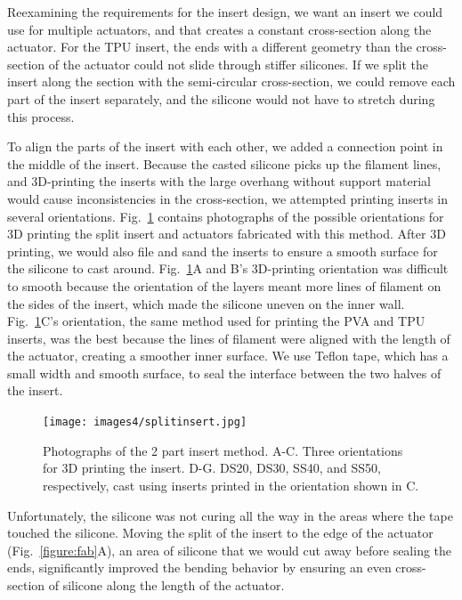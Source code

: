 Reexamining the requirements for the insert design, we want an insert we could use for multiple actuators, and that creates a constant cross-section along the actuator. For the TPU insert, the ends with a different geometry than the cross-section of the actuator could not slide through stiffer silicones. If we split the insert along the section with the semi-circular cross-section, we could remove each part of the insert separately, and the silicone would not have to stretch during this process. 

To align the parts of the insert with each other, we added a connection point in the middle of the insert. Because the casted silicone picks up the filament lines, and 3D-printing the inserts with the large overhang without support material would cause inconsistencies in the cross-section, we attempted printing inserts in several orientations. Fig.~\ref{fig:splitinsert} contains photographs of the possible orientations for 3D printing the split insert and actuators fabricated with this method. After 3D printing, we would also file and sand the inserts to ensure a smooth surface for the silicone to cast around. Fig.~\ref{fig:splitinsert}A and B's 3D-printing orientation was difficult to smooth because the orientation of the layers meant more lines of filament on the sides of the insert, which made the silicone uneven on the inner wall. Fig.~\ref{fig:splitinsert}C's orientation, the same method used for printing the PVA and TPU inserts, was the best because the lines of filament were aligned with the length of the actuator, creating a smoother inner surface. We use Teflon tape, which has a small width and smooth surface, to seal the interface between the two halves of the insert. \\

\begin{figure}[ht!]
    \centering
    \texttt{[image: images4/splitinsert.jpg]}
    \caption{Photographs of the 2 part insert method. A-C. Three orientations for 3D printing the insert. D-G. DS20, DS30, SS40, and SS50, respectively, cast using inserts printed in the orientation shown in C.}
    \label{fig:splitinsert}
\end{figure}

Unfortunately, the silicone was not curing all the way in the areas where the tape touched the silicone. Moving the split of the insert to the edge of the actuator (Fig.~\ref{figure:fab}A), an area of silicone that we would cut away before sealing the ends, significantly improved the bending behavior by ensuring an even cross-section of silicone along the length of the actuator. 

